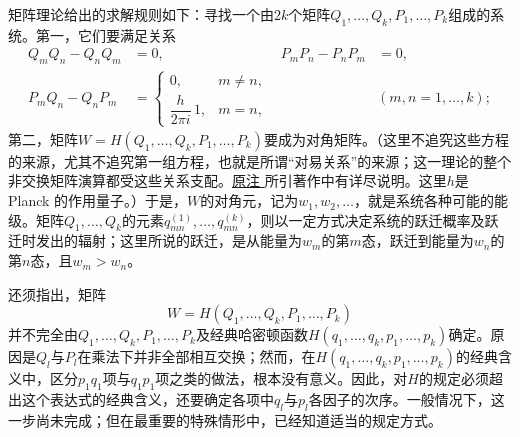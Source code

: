 \documentclass[fontsize=13pt,twoside,openany,headings=normal,parskip=false,bookmarkpackage=false,DIV=calc]{scrbook}
\begin{document}
矩阵理论给出的求解规则如下：寻找一个由$2k$个矩阵$Q_1,\allowbreak \ldots,\allowbreak Q_k,\allowbreak P_1,\allowbreak \ldots,\allowbreak P_k$组成的系统。第一，它们要满足关系
\leavevmode{}\label{rel:I.2.commutation}
\begin{align*}
 Q_mQ_n-Q_nQ_m&=0,& P_mP_n-P_nP_m&=0,\\
 P_mQ_n-Q_nP_m&=
 \begin{cases}0,&m\ne n,\\ \dfrac{h}{2\pi i}\,1,&m=n,\end{cases}
 &&(m,n=1,\ldots,k);
\end{align*}
第二，矩阵$W=H(Q_1,\allowbreak \ldots,\allowbreak Q_k,\allowbreak P_1,\allowbreak \ldots,\allowbreak P_k)$要成为对角矩阵。（这里不追究这些方程的来源，尤其不追究第一组方程，也就是所谓“对易关系”的来源；这一理论的整个非交换矩阵演算都受这些关系支配。\CJKglue \hyperlink{note-1}{原注 } 所引著作中有详尽说明。这里$h$是 Planck 的作用量子。）于是，$W$的对角元，记为$w_1,\allowbreak w_2,\allowbreak \ldots$，就是系统各种可能的能级。矩阵$Q_1,\allowbreak \ldots,\allowbreak Q_k$的元素$q^{(1)}_{mn},\allowbreak \ldots,\allowbreak q^{(k)}_{mn}$，则以一定方式决定系统的跃迁概率及跃迁时发出的辐射；这里所说的跃迁，是从能量为$w_m$的第$m$态，跃迁到能量为$w_n$的第$n$态，且$w_m>w_n$。

还须指出，矩阵
\[
 W=H(Q_1,\ldots,Q_k,P_1,\ldots,P_k)
\]
并不完全由$Q_1,\allowbreak \ldots,\allowbreak Q_k,\allowbreak P_1,\allowbreak \ldots,\allowbreak P_k$及经典哈密顿函数$H(q_1,\allowbreak \ldots,\allowbreak q_k,\allowbreak p_1,\allowbreak \ldots,\allowbreak p_k)$确定。原因是$Q_l$与$P_l$在乘法下并非全部相互交换；然而，在$H(q_1,\allowbreak \ldots,\allowbreak q_k,\allowbreak p_1,\allowbreak \ldots,\allowbreak p_k)$的经典含义中，区分$p_1q_1$项与$q_1p_1$项之类的做法，根本没有意义。因此，对$H$的规定必须超出这个表达式的经典含义，还要确定各项中$q_l$与$p_l$各因子的次序。一般情况下，这一步尚未完成；但在最重要的特殊情形中，已经知道适当的规定方式。
\end{document}
